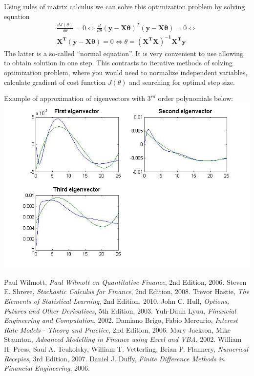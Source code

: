 \documentclass[11pt]{article} %
\begin{document}
Using rules of \href{http://en.wikipedia.org/wiki/Matrix\_calculus}{matrix calculus} we can solve this optimization problem by solving equation 
\begin{alignat}{1}
\frac{dJ(\theta)}{d\theta} = 0 \iff 
\frac{d}{d\theta} \left(\mathbf{y}-\mathbf{X\theta}\right)^T\left(\mathbf{y}-\mathbf{X\theta}\right) = 0
\iff \nonumber \\
\mathbf{X^T}(\mathbf{y-X\theta}) = 0 \iff \theta = \mathbf{\left(X^T X\right)^{-1}X^T y}
\end{alignat}
The latter is a so-called ``normal equation''. It is very convenient to use allowing to obtain solution in one step. This contrasts to iterative methods of solving optimization problem, where you would need to normalize independent variables, calculate gradient of cost function $J(\theta)$ and searching for optimal step size. 

Example of approximation of eigenvectors with $3^{rd}$ order polynomials below:\\
\includegraphics[scale=0.6]{fitting.jpg}\\

\begin{thebibliography}{9}
 Paul Wilmott, \emph{Paul Wilmott on Quantitative Finance}, 2nd Edition, 2006.
 Steven E. Shreve, \emph{Stochastic Calculus for Finance}, 2nd Edition, 2008.
 Trevor Hastie, \emph{The Elements of Statistical Learning}, 2nd Edition, 2010.
 John C. Hull, \emph{Options, Futures and Other Derivatives}, 5th Edition, 2003.
 Yuh-Dauh Lyuu, \emph{Financial Engineering and Computation}, 2002.
 Damiano Brigo, Fabio Mercurio, \emph{Interest Rate Models - Theory and Practice}, 2nd Edition, 2006.
 Mary Jackson, Mike Staunton, \emph{Advanced Modelling in Finance using Excel and VBA}, 2002.
 William H. Press, Saul A. Teukolsky, William T. Vetterling, Brian P. Flannery,  \emph{Numerical Recepies}, 3rd Edition, 2007.
 Daniel J. Duffy,  \emph{Finite Difference Methods in Financial Engineering}, 2006.

\end{thebibliography}
\end{document}
